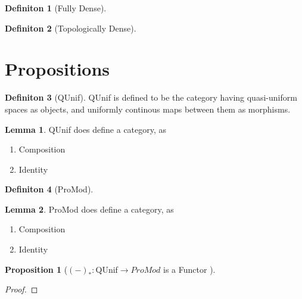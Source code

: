 \documentclass[18pt,a4paper]{article}
\theoremstyle{definition}
\newtheorem{definition}{Definiton}[section]
\newtheorem{lemma}{Lemma}[definition]
\newtheorem{proop}{Proposition}[section]
\begin{document}
\begin{definition}[Fully Dense] %

\end{definition}
\begin{definition}[Topologically Dense] %

\end{definition}
\section{Propositions}
\begin{definition}[QUnif] %
QUnif is defined to be the category having quasi-uniform spaces as objects, and uniformly continous
maps between them as morphisms.
\end{definition}
\begin{lemma} QUnif does define a category, as
	\begin{enumerate}[label=\roman*]
		\item Composition
		\item Identity
	\end{enumerate}
\end{lemma}

\begin{definition}[ProMod] %

\end{definition}

\begin{lemma} ProMod does define a category, as
	\begin{enumerate}[label=\roman*]
		\item Composition
		\item Identity
	\end{enumerate}
\end{lemma}


\begin{proop}[$(-)_*:$QUnif$\to ProMod$ is a Functor ]

\end{proop}
\begin{proof}

\end{proof}
\end{document}
